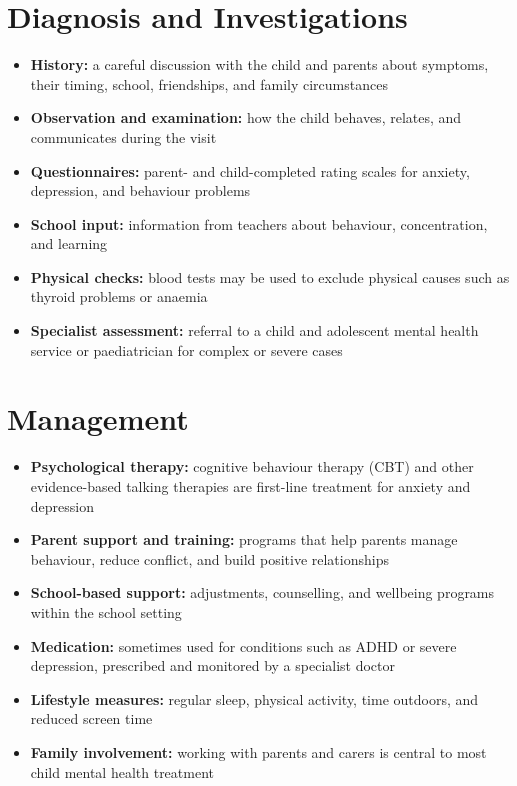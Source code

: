 \section*{Diagnosis and Investigations}
\begin{itemize}
    \item \textbf{History:} a careful discussion with the child and parents about symptoms, their timing, school, friendships, and family circumstances
    \item \textbf{Observation and examination:} how the child behaves, relates, and communicates during the visit
    \item \textbf{Questionnaires:} parent- and child-completed rating scales for anxiety, depression, and behaviour problems
    \item \textbf{School input:} information from teachers about behaviour, concentration, and learning
    \item \textbf{Physical checks:} blood tests may be used to exclude physical causes such as thyroid problems or anaemia
    \item \textbf{Specialist assessment:} referral to a child and adolescent mental health service or paediatrician for complex or severe cases
\end{itemize}

\section*{Management}
\begin{itemize}
    \item \textbf{Psychological therapy:} cognitive behaviour therapy (CBT) and other evidence-based talking therapies are first-line treatment for anxiety and depression
    \item \textbf{Parent support and training:} programs that help parents manage behaviour, reduce conflict, and build positive relationships
    \item \textbf{School-based support:} adjustments, counselling, and wellbeing programs within the school setting
    \item \textbf{Medication:} sometimes used for conditions such as ADHD or severe depression, prescribed and monitored by a specialist doctor
    \item \textbf{Lifestyle measures:} regular sleep, physical activity, time outdoors, and reduced screen time
    \item \textbf{Family involvement:} working with parents and carers is central to most child mental health treatment
\end{itemize}

